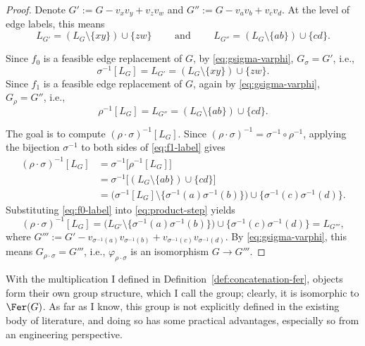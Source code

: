 \begin{proof}
    Denote $G':=G-v_xv_y+v_zv_w$ and $G'':=G-v_av_b+v_cv_d$.
    At the level of edge labels, this means
    \[
        L_{G'}=(L_G\setminus\{xy\})\cup\{zw\}\qquad\text{ and }\qquad L_{G''}=(L_G\setminus\{ab\})\cup\{cd\}.
    \]

    Since $f_0$ is a feasible edge replacement of $G$, by \eqref{eq:gsigma-varphi}, $G_\sigma=G'$, i.e.,
    \begin{equation}\label{eq:f0-label}
        \sigma^{-1}[L_G]=L_{G'}=(L_G\setminus\{xy\})\cup\{zw\}.
    \end{equation}
    Since $f_1$ is a feasible edge replacement of $G$, again by \eqref{eq:gsigma-varphi}, $G_\rho=G''$, i.e.,
    \begin{equation}\label{eq:f1-label}
        \rho^{-1}[L_G]=L_{G''}=(L_G\setminus\{ab\})\cup\{cd\}.
    \end{equation}
    
    The goal is to compute $(\rho\cdot\sigma)^{-1}[L_G]$.
    Since $(\rho\cdot\sigma)^{-1}=\sigma^{-1}\circ\rho^{-1}$, applying the bijection $\sigma^{-1}$ to both sides of \eqref{eq:f1-label} gives
    \begin{align}
        (\rho\cdot\sigma)^{-1}[L_G]
            &= \sigma^{-1}\bigl[\rho^{-1}[L_G]\bigr] \nonumber\\
            &= \sigma^{-1}\bigl[(L_G\setminus\{ab\})\cup\{cd\}\bigr] \nonumber\\
            &= \bigl(\sigma^{-1}[L_G]\setminus\{\sigma^{-1}(a)\sigma^{-1}(b)\}\bigr)\cup\{\sigma^{-1}(c)\sigma^{-1}(d)\}. \label{eq:product-step}
    \end{align}
    Substituting \eqref{eq:f0-label} into \eqref{eq:product-step} yields
    \[
        (\rho\cdot\sigma)^{-1}[L_G]= \bigl(L_{G'}\setminus\{\sigma^{-1}(a)\sigma^{-1}(b)\}\bigr)\cup\{\sigma^{-1}(c)\sigma^{-1}(d)\} = L_{G'''},
    \]
    where $G''':=G'-v_{\sigma^{-1}(a)}v_{\sigma^{-1}(b)}+v_{\sigma^{-1}(c)}v_{\sigma^{-1}(d)}$.
    By \eqref{eq:gsigma-varphi}, this means $G_{\rho\cdot\sigma}=G'''$, i.e., $\varphi_{\rho\cdot\sigma}$ is an isomorphism $G\to G'''$.
\end{proof}

With the multiplication I defined in Definition~\ref{def:concatenation-fer}, \tfer objects form their own group structure, which I call the \tFer group; clearly, it is isomorphic to $\Fer(G)$.
As far as I know, this group is not explicitly defined in the existing body of literature, and doing so has some practical advantages, especially so from an engineering perspective.
